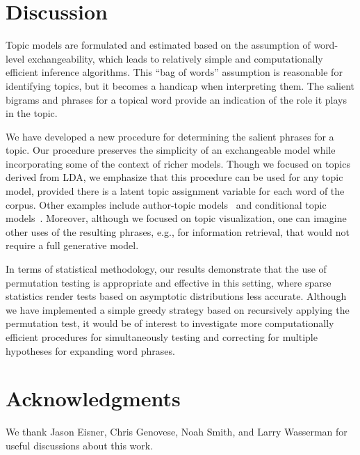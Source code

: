\documentclass[11pt]{article}
\begin{document}
\section{Discussion}

Topic models are formulated and estimated based on the assumption of
word-level exchangeability, which leads to relatively simple and
computationally efficient inference algorithms.  This ``bag of words''
assumption is reasonable for identifying topics, but it becomes a
handicap when interpreting them.  The salient bigrams and phrases for
a topical word provide an indication of the role it plays in the
topic.

We have developed a new procedure for determining the salient phrases
for a topic.  Our procedure preserves the simplicity of an
exchangeable model while incorporating some of the context of richer
models.  Though we focused on topics derived from LDA, we emphasize
that this procedure can be used for any topic model, provided there is
a latent topic assignment variable for each word of the corpus.  Other
examples include author-topic models~\citep{Rosen-Zvi:2004} and
conditional topic models~\citep{Mimno:2008}.  Moreover, although we
focused on topic visualization, one can imagine other uses of the
resulting phrases, e.g., for information retrieval, that would not
require a full generative model.

In terms of statistical methodology, our results demonstrate that the
use of permutation testing is appropriate and effective in this
setting, where sparse statistics render tests based on asymptotic
distributions less accurate.  Although we have implemented a simple
greedy strategy based on recursively applying the permutation test, it
would be of interest to investigate more computationally efficient
procedures for simultaneously testing and correcting for multiple
hypotheses for expanding word phrases.

\section*{Acknowledgments}

We thank Jason Eisner, Chris Genovese, Noah Smith, and Larry Wasserman
for useful discussions about this work.



\end{document}
